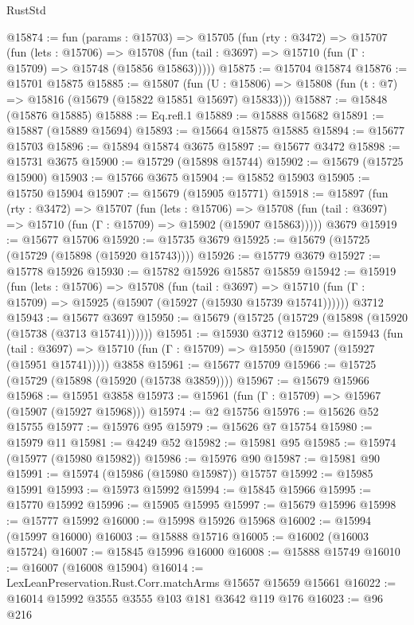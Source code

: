 \begin{lexlean}{RustStd}
\begin{coremodule}
@15874 := fun (params : @15703) =>
  @15705
    (fun (rty : @3472) =>
    @15707
      (fun (lets : @15706) =>
      @15708 (fun (tail : @3697) => @15710 (fun (Γ : @15709) => @15748 (@15856 @15863)))))
@15875 := @15704 @15874
@15876 := @15701 @15875
@15885 := @15807
    (fun (U : @15806) => @15808 (fun (t : @7) => @15816 (@15679 (@15822 @15851 @15697) @15833)))
@15887 := @15848 (@15876 @15885)
@15888 := Eq.refl.{1}
@15889 := @15888 @15682
@15891 := @15887 (@15889 @15694)
@15893 := @15664 @15875 @15885
@15894 := @15677 @15703
@15896 := @15894 @15874 @3675
@15897 := @15677 @3472
@15898 := @15731 @3675
@15900 := @15729 (@15898 @15744)
@15902 := @15679 (@15725 @15900)
@15903 := @15766 @3675
@15904 := @15852 @15903
@15905 := @15750 @15904
@15907 := @15679 (@15905 @15771)
@15918 := @15897
    (fun (rty : @3472) =>
    @15707
      (fun (lets : @15706) =>
      @15708 (fun (tail : @3697) => @15710 (fun (Γ : @15709) => @15902 (@15907 @15863)))))
    @3679
@15919 := @15677 @15706
@15920 := @15735 @3679
@15925 := @15679 (@15725 (@15729 (@15898 (@15920 @15743))))
@15926 := @15779 @3679
@15927 := @15778 @15926
@15930 := @15782 @15926 @15857 @15859
@15942 := @15919
    (fun (lets : @15706) =>
    @15708
      (fun (tail : @3697) =>
      @15710 (fun (Γ : @15709) => @15925 (@15907 (@15927 (@15930 @15739 @15741))))))
    @3712
@15943 := @15677 @3697
@15950 := @15679 (@15725 (@15729 (@15898 (@15920 (@15738 (@3713 @15741))))))
@15951 := @15930 @3712
@15960 := @15943
    (fun (tail : @3697) => @15710 (fun (Γ : @15709) => @15950 (@15907 (@15927 (@15951 @15741)))))
    @3858
@15961 := @15677 @15709
@15966 := @15725 (@15729 (@15898 (@15920 (@15738 @3859))))
@15967 := @15679 @15966
@15968 := @15951 @3858
@15973 := @15961 (fun (Γ : @15709) => @15967 (@15907 (@15927 @15968)))
@15974 := @2 @15756
@15976 := @15626 @52 @15755
@15977 := @15976 @95
@15979 := @15626 @7 @15754
@15980 := @15979 @11
@15981 := @4249 @52
@15982 := @15981 @95
@15985 := @15974 (@15977 (@15980 @15982))
@15986 := @15976 @90
@15987 := @15981 @90
@15991 := @15974 (@15986 (@15980 @15987)) @15757
@15992 := @15985 @15991
@15993 := @15973 @15992
@15994 := @15845 @15966
@15995 := @15770 @15992
@15996 := @15905 @15995
@15997 := @15679 @15996
@15998 := @15777 @15992
@16000 := @15998 @15926 @15968
@16002 := @15994 (@15997 @16000)
@16003 := @15888 @15716
@16005 := @16002 (@16003 @15724)
@16007 := @15845 @15996 @16000
@16008 := @15888 @15749
@16010 := @16007 (@16008 @15904)
@16014 := LexLeanPreservation.Rust.Corr.matchArms @15657 @15659 @15661
@16022 := @16014 @15992 @3555 @3555 @103 @181 @3642 @119 @176
@16023 := @96 @216

\end{coremodule}
\end{lexlean}
